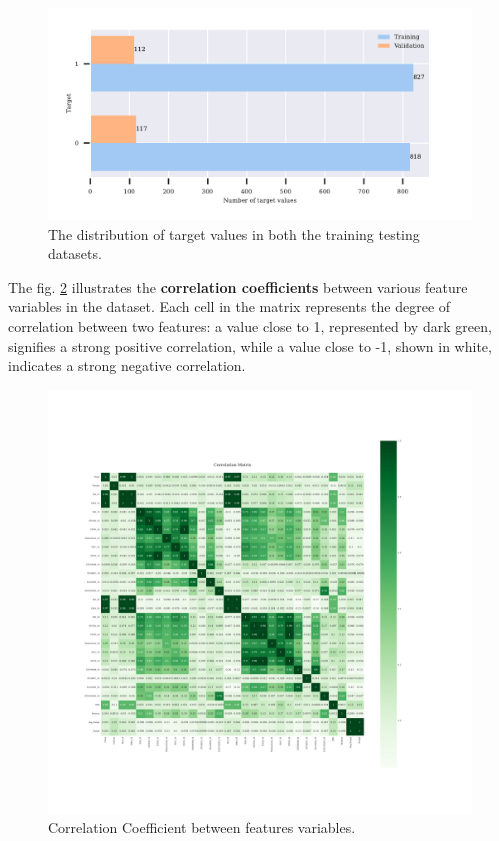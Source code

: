 \begin{figure}[h]
\centering
\begin{adjustbox}{max width=1\textwidth,center}
    \includegraphics[scale=1]{./pdf/report/sig_distr.pdf}
\end{adjustbox}
    \caption{The distribution of target values in both the training testing datasets.}
\label{fig:signal_distribution}
\end{figure}

The fig. \ref{fig:corr_coef} illustrates the \textbf{correlation coefficients} between various feature variables in the dataset.
Each cell in the matrix represents the degree of correlation between two features: a value close to 1, represented by dark green, signifies a strong positive correlation, while a value close to -1, shown in white, indicates a strong negative correlation.

\begin{figure}[h]
\centering
\begin{adjustbox}{max width=1.2\textwidth,center}
    \includegraphics[scale=1.2, trim={30mm 70mm 50mm 110mm}, clip]{./pdf/correlation_matrix.pdf}
\end{adjustbox}
\caption{Correlation Coefficient between features variables.}
\label{fig:corr_coef}
\end{figure}

